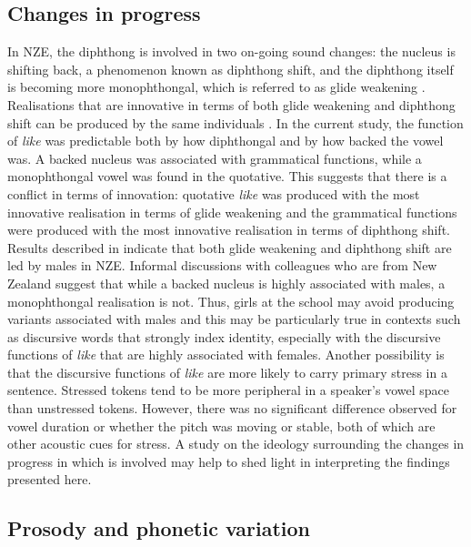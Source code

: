 \subsection{Changes in progress}
In NZE, the diphthong  is involved in two on-going sound changes: the nucleus is shifting back, a phenomenon known as diphthong shift, \citep[149]{onzebook} and the diphthong itself is becoming more monophthongal, which is referred to as glide weakening \citep{onzebook,chartres2008}. Realisations that are innovative in terms of both glide weakening and diphthong shift can be produced by the same individuals \citep{chartres2008}. In the current study, the function of \textit{like} was predictable both by how diphthongal and by how backed the vowel was. A backed nucleus was associated with grammatical functions, while a monophthongal vowel was found in the quotative. This suggests that there is a conflict in terms of innovation: quotative \textit{like} was produced with the most innovative realisation in terms of glide weakening and the grammatical functions were produced with the most innovative realisation in terms of diphthong shift. Results described in \citet{chartres2008} indicate that both glide weakening and diphthong shift are led by males in NZE. Informal discussions with colleagues who are from New Zealand suggest that while a backed nucleus is highly associated with males, a monophthongal realisation is not. Thus, girls at the school may avoid producing variants associated with males and this may be particularly true in contexts such as discursive words that strongly index identity, especially with the discursive functions of \textit{like} that are highly associated with females. Another possibility is that the discursive functions of \textit{like} are more likely to carry primary stress in a sentence. Stressed tokens tend to be more peripheral in a speaker's vowel space than unstressed tokens. However, there was no significant difference observed for vowel duration or whether the pitch was moving or stable, both of which are other acoustic cues for stress. A study on the ideology surrounding the changes in progress in which  is involved may help to shed light in interpreting the findings presented here.

\subsection{Prosody and phonetic variation}\label{sec:prosody}

